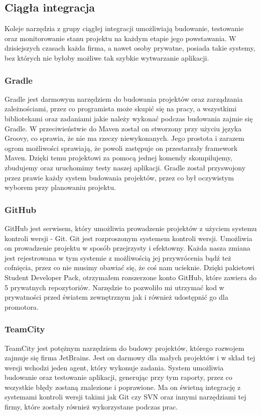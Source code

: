 \subsection{Ciągła integracja}
Koleje narzędzia z grupy ciągłej integracji umożliwiają budowanie, testowanie oraz monitorowanie stanu projektu na każdym etapie jego powstawania. W dzisiejszych czasach każda firma, a nawet osoby prywatne, posiada takie systemy, bez których nie byłoby możliwe tak szybkie wytwarzanie aplikacji.

\subsubsection{Gradle}
Gradle jest darmowym narzędziem do budowania projektów oraz zarządzania zależnościami, przez co programista może skupić się na pracy, a wszystkimi bibliotekami oraz zadaniami jakie należy wykonać podczas budowania zajmie się Gradle. W przeciwieństwie do Maven został on stworzony przy użyciu języka Groovy, co sprawia, że nie ma rzeczy niewykonanych. Jego prostota i zarazem ogrom możliwości sprawiają, że powoli zastępuje on przestarzały framework Maven. Dzięki temu projektowi za pomocą jednej komendy skompilujemy, zbudujemy oraz uruchomimy testy naszej aplikacji. Gradle został przyswojony przez prawie każdy system budowania projektów, przez co był oczywistym wyborem przy planowaniu projektu.

\subsubsection{GitHub}
GitHub jest serwisem, który umożliwia prowadzenie projektów z użyciem systemu kontroli wersji - Git. Git jest rozproszonym systemem kontroli wersji. Umożliwia on prowadzenie projektu w sposób przejrzysty i efektowny. Każda nasza zmiana jest rejestrowana w tym systemie z możliwością jej przywrócenia bądź też cofnięcia, przez co nie musimy obawiać się, że coś nam ucieknie. Dzięki pakietowi Student Developer Pack, otrzymałem rozszerzone konto GitHub, które zawiera do 5 prywatnych repozytoriów. Narzędzie to pozwoliło mi utrzymać kod w prywatności przed światem zewnętrznym jak i również udostępnić go dla promotora.


\subsubsection{TeamCity}
TeamCity jest potężnym narzędziem do budowy projektów, którego rozwojem zajmuje się firma JetBrains. Jest on darmowy dla małych projektów i w skład tej wersji wchodzi jeden agent, który wykonuje zadania. System umożliwia budowanie oraz testowanie aplikacji, generując przy tym raporty, przez co wszystkie błędy zostaną znalezione i poprawione. Ma on świetną integrację z systemami kontroli wersji takimi jak Git czy SVN oraz innymi narzędziami tej firmy, które zostały również wykorzystane podczas prac.

